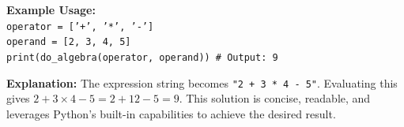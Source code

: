 \begin{ReasoningBox}[title={Case Study: Code Generation (Smaller \& Larger Setting)}, breakable]
\textbf{Example Usage:}\\
\hspace*{1em}\texttt{operator = ['+', '*', '-']}\\
\hspace*{1em}\texttt{operand = [2, 3, 4, 5]}\\
\hspace*{1em}\texttt{print(do\_algebra(operator, operand))  \# Output: 9}

\textbf{Explanation:} The expression string becomes \texttt{"2 + 3 * 4 - 5"}. Evaluating this gives $2 + 3 \times 4 - 5 = 2 + 12 - 5 = 9$. This solution is concise, readable, and leverages Python's built-in capabilities to achieve the desired result.
\end{ReasoningBox}
\label{fig:example_code_scale}
